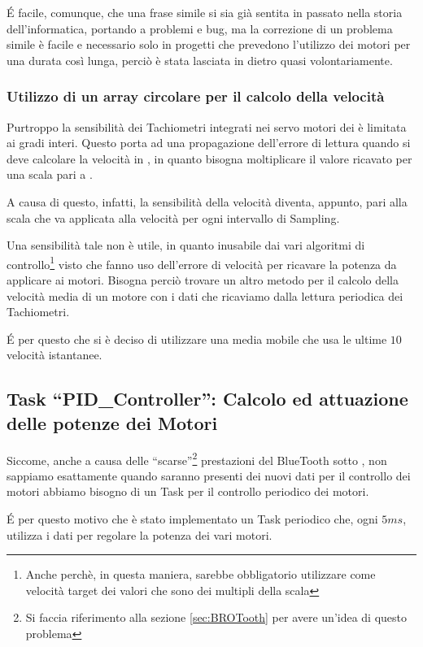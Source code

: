\'E facile, comunque, che una frase simile si sia già sentita in passato nella
storia dell'informatica, portando a problemi e bug, ma la correzione di un
problema simile è facile e necessario solo in progetti che prevedono
l'utilizzo dei motori per una durata così lunga, perciò è stata lasciata in
dietro quasi volontariamente.

\subsubsection{Utilizzo di un array circolare per il calcolo della velocità}
Purtroppo la sensibilità dei Tachiometri integrati nei servo motori dei
\nxt{} è limitata ai gradi interi. Questo porta ad una propagazione
dell'errore di lettura quando si deve calcolare la velocità in
, in quanto bisogna moltiplicare il valore
ricavato per una scala pari a .

A causa di questo, infatti, la sensibilità della velocità diventa, appunto,
pari alla scala che va applicata alla velocità per ogni intervallo di
Sampling.

Una sensibilità tale non è utile, in quanto inusabile dai vari algoritmi
di controllo\footnote{Anche perchè, in questa maniera, sarebbe obbligatorio
utilizzare come velocità target dei valori che sono dei multipli della
scala} visto che fanno uso dell'errore di velocità per ricavare la potenza da
applicare ai motori. Bisogna perciò trovare un altro metodo per il calcolo della
velocità media di un motore con i dati che ricaviamo dalla lettura
periodica dei Tachiometri.

\'E per questo che si è deciso di utilizzare una media mobile che usa le
ultime $10$ velocità istantanee.

\subsection[Task ``PID\_Controller'']{Task ``PID\_Controller'': Calcolo ed
attuazione delle potenze dei Motori}\label{sec:BROPIDS}
Siccome, anche a causa delle ``scarse''\footnote{Si faccia riferimento alla
sezione \ref{sec:BROTooth} per avere un'idea di questo problema}
prestazioni del BlueTooth sotto \nxtOSEK{}, non sappiamo esattamente quando 
saranno presenti dei nuovi dati per il controllo dei motori abbiamo bisogno
di un Task per il controllo periodico dei motori.

\'E per questo motivo che è stato implementato un Task periodico che, ogni
$5ms$, utilizza i dati per regolare la potenza dei vari motori.

